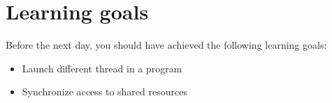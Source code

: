 \documentclass{article}
\begin{document}
\section*{Learning goals}
\label{sec:learning-goals}

Before the next day, you should have achieved the following learning
goals: 

\begin{itemize}
\item Launch different thread in a program
\item Synchronize access to shared resources
\end{itemize}






\end{document}
